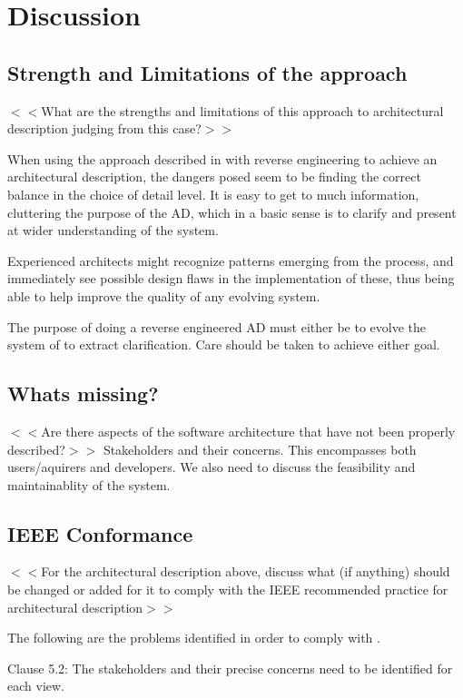 \documentclass[a4paper,10pt]{article}
\begin{document}
\section{Discussion}
\subsection{Strength and Limitations of the approach}
$<<$What are the strengths and limitations of this approach to
architectural description judging from this case?$>>$

When using the approach described in \cite{christensen2004archdesc} with reverse 
engineering to achieve an architectural description, the dangers posed seem to 
be finding the correct balance in the choice of detail level. It
is easy to get to much information, cluttering the purpose of the 
AD, which in a basic sense is to clarify and present at wider understanding of
the system.

Experienced architects might recognize patterns emerging from the process, and 
immediately see possible design flaws in the implementation of these, thus
being able to help improve the quality of any evolving system.

The purpose of doing a reverse engineered AD must either be to evolve
the system of to extract clarification. Care should be taken to achieve either
goal. 
\subsection{Whats missing?}
$<<$Are there aspects of the software architecture that have not been
properly described?$>>$
Stakeholders and their concerns. This encompasses both users/aquirers and developers. We also need to discuss the feasibility and maintainablity of the system. 

\subsection{IEEE Conformance}

$<<$For the architectural description above, discuss what (if anything) should be changed or added for it to comply with the IEEE recommended practice for architectural description$>>$

The following are the problems identified in order to comply with \cite{ieeerecommendedpractice}.

Clause 5.2: The stakeholders and their precise concerns need to be identified for each view. 
\end{document}
